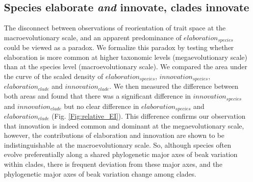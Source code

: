 \documentclass[12pt,letterpaper]{article}
\begin{document}
\subsection{Species elaborate \textit{and} innovate, clades innovate} %
The disconnect between observations of reorientation of trait space at the macroevolutionary scale, and an apparent predominance of $elaboration_{species}$ could be viewed as a paradox.
We formalize this paradox by testing whether elaboration is more common at higher taxonomic levels (megaevolutionary scale) than at the species level (macroevolutionary scale).
We compared the area under the curve of the scaled density of $elaboration_{species}$, $innovation_{species}$, $elaboration_{clade}$ and $innovation_{clade}$.
We then measured the difference between both areas and found that there was a significant difference in $innovation_{species}$ and $innovation_{clade}$ but no clear difference in $elaboration_{species}$ and $elaboration_{clade}$ (Fig. \ref{Fig:relative_EI}).
This difference confirms our observation that innovation is indeed common and dominant at the megaevolutionary scale, however, the contributions of elaboration and innovation are shown to be indistinguishable at the macroevolutionary scale.
So, although species often evolve preferentially along a shared phylogenetic major axes of beak variation within clades, there is frequent deviation from these major axes, and the phylogenetic major axes of beak variation change among clades.
\end{document}
